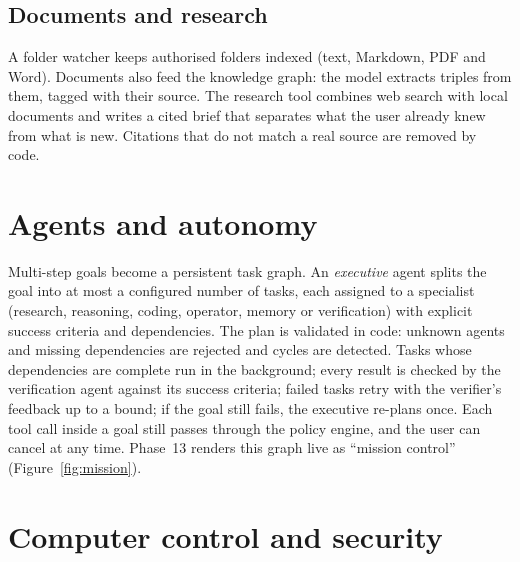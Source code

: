 \documentclass[11pt,a4paper]{article}
\begin{document}
\subsection{Documents and research}
A folder watcher keeps authorised folders indexed (text, Markdown, PDF and Word). Documents also feed the knowledge graph: the model extracts triples from them, tagged with their source. The research tool combines web search with local documents and writes a cited brief that separates what the user already knew from what is new. Citations that do not match a real source are removed by code.

\section{Agents and autonomy}

Multi-step goals become a persistent task graph. An \emph{executive} agent splits the goal into at most a configured number of tasks, each assigned to a specialist (research, reasoning, coding, operator, memory or verification) with explicit success criteria and dependencies. The plan is validated in code: unknown agents and missing dependencies are rejected and cycles are detected. Tasks whose dependencies are complete run in the background; every result is checked by the verification agent against its success criteria; failed tasks retry with the verifier's feedback up to a bound; if the goal still fails, the executive re-plans once. Each tool call inside a goal still passes through the policy engine, and the user can cancel at any time. Phase~13 renders this graph live as ``mission control'' (Figure~\ref{fig:mission}).

\section{Computer control and security}\label{sec:security}
\end{document}

